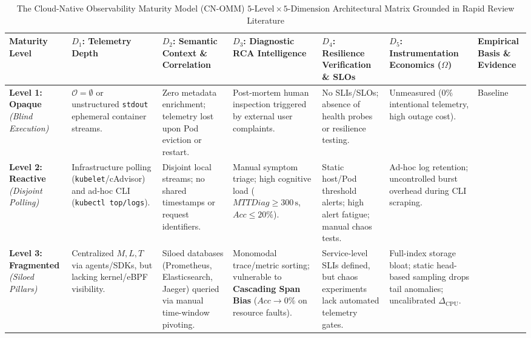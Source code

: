 \begin{table}[t]
\centering
\caption{The Cloud-Native Observability Maturity Model (CN-OMM) $5\text{-Level} \times 5\text{-Dimension}$ Architectural Matrix Grounded in Rapid Review Literature}
\label{tab:cn_omm_matrix}
\footnotesize
\setlength{\tabcolsep}{3.0pt}
\renewcommand{\arraystretch}{1.22}
\begin{tabularx}{\textwidth}{l >{\raggedright\arraybackslash}X >{\raggedright\arraybackslash}X >{\raggedright\arraybackslash}X >{\raggedright\arraybackslash}X >{\raggedright\arraybackslash}X p{2.1cm}}
\toprule
\textbf{Maturity Level} & \textbf{$D_1$: Telemetry Depth} & \textbf{$D_2$: Semantic Context \& Correlation} & \textbf{$D_3$: Diagnostic RCA Intelligence} & \textbf{$D_4$: Resilience Verification \& SLOs} & \textbf{$D_5$: Instrumentation Economics ($\Omega$)} & \textbf{Empirical Basis \& Evidence} \\
\midrule
\textbf{Level 1: Opaque} \newline \textit{(Blind Execution)} & $\mathcal{O} = \emptyset$ or unstructured \texttt{stdout} ephemeral container streams. & Zero metadata enrichment; telemetry lost upon Pod eviction or restart. & Post-mortem human inspection triggered by external user complaints. & No SLIs/SLOs; absence of health probes or resilience testing. & Unmeasured ($0\%$ intentional telemetry, high outage cost). & Baseline~\cite{kosinska_2023, usman_2022} \\
\midrule
\textbf{Level 2: Reactive} \newline \textit{(Disjoint Polling)} & Infrastructure polling (\texttt{kubelet}/cAdvisor) and ad-hoc CLI (\texttt{kubectl top/logs}). & Disjoint local streams; no shared timestamps or request identifiers. & Manual symptom triage; high cognitive load ($MTTDiag \ge 300\,\text{s}$, $Acc \le 20\%$). & Static host/Pod threshold alerts; high alert fatigue; manual chaos tests. & Ad-hoc log retention; uncontrolled burst overhead during CLI scraping. &~\cite{zanatta_23, faseeha_2025, usman_2022} \\
\midrule
\textbf{Level 3: Fragmented} \newline \textit{(Siloed Pillars)} & Centralized $M, L, T$ via agents/SDKs, but lacking kernel/eBPF visibility. & Siloed databases (Prometheus, Elasticsearch, Jaeger) queried via manual time-window pivoting. & Monomodal trace/metric sorting; vulnerable to \textbf{Cascading Span Bias} ($Acc \rightarrow 0\%$ on resource faults). & Service-level SLIs defined, but chaos experiments lack automated telemetry gates. & Full-index storage bloat; static head-based sampling drops tail anomalies; uncalibrated $\Delta_{\text{CPU}}$. &~\cite{araujo_2024, hartikainen_2024, wei_2025, patel_2025} \\

\end{tabularx}
\end{table}

